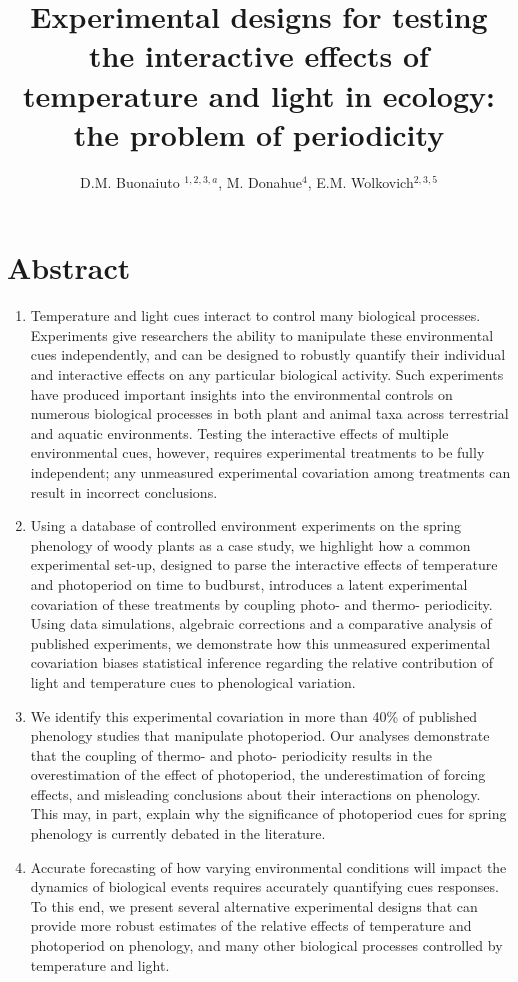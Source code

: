 \documentclass[11pt]{article}
\title{Experimental designs for testing the interactive effects of temperature and light in ecology: the problem of periodicity }
\date{}
\author{D.M. Buonaiuto $^{1,2,3,a}$, M. Donahue$^{4}$, E.M. Wolkovich$^{2,3,5}$}
\begin{document}
\section*{Abstract}
\begin{enumerate}
\item Temperature and light cues interact to control many biological processes. Experiments give researchers the ability to manipulate these environmental cues independently, and can be designed to robustly quantify their individual and interactive effects on any particular biological activity. Such experiments have produced important insights into the environmental controls on numerous biological processes in both plant and animal taxa across terrestrial and aquatic environments. Testing the interactive effects of multiple environmental cues, however, requires experimental treatments to be fully independent; any unmeasured experimental covariation among treatments can result in incorrect conclusions.

\item  Using a database of controlled environment experiments on the spring phenology of woody plants as a case study, we highlight how a common experimental set-up, designed to parse the interactive effects of temperature and photoperiod on time to budburst, introduces a latent experimental covariation of these treatments by coupling photo- and thermo- periodicity. Using data simulations, algebraic corrections and a comparative analysis of published experiments, we demonstrate how this unmeasured experimental covariation biases statistical inference regarding the relative contribution of light and temperature cues to phenological variation.

\item We identify this experimental covariation in more than 40\% of published phenology studies that manipulate photoperiod. Our analyses demonstrate that the coupling of thermo- and photo- periodicity results in the overestimation of the effect of photoperiod, the underestimation of forcing effects, and misleading conclusions about their interactions on phenology. This may, in part, explain why the significance of photoperiod cues for spring phenology is currently debated in the literature.

\item Accurate forecasting of how varying environmental conditions will impact the dynamics of biological events requires accurately quantifying cues responses. To this end, we present several alternative experimental designs that can provide more robust estimates of the relative effects of temperature and photoperiod on phenology, and many other biological processes controlled by temperature and light.
\end{enumerate}
\end{document}
